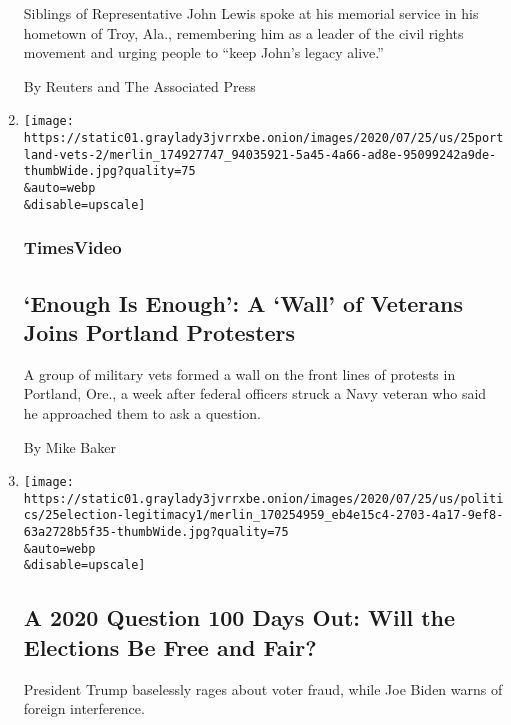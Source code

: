 \begin{enumerate}
  Siblings of Representative John Lewis spoke at his memorial service in
  his hometown of Troy, Ala., remembering him as a leader of the civil
  rights movement and urging people to ``keep John's legacy alive.''

  By Reuters and The Associated Press
\item
  \href{/video/us/politics/100000007256689/portland-protest-wall-of-vets.html}{}

  \texttt{[image: https://static01.graylady3jvrrxbe.onion/images/2020/07/25/us/25portland-vets-2/merlin\_174927747\_94035921-5a45-4a66-ad8e-95099242a9de-thumbWide.jpg?quality=75\\\&auto=webp\\\&disable=upscale]}

  \hypertarget{timesvideo-1}{%
  \subsubsection{TimesVideo}\label{timesvideo-1}}

  \hypertarget{enough-is-enough-a-wall-of-veterans-joins-portland-protesters}{%
  \subsection{`Enough Is Enough': A `Wall' of Veterans Joins Portland
  Protesters}\label{enough-is-enough-a-wall-of-veterans-joins-portland-protesters}}

  A group of military vets formed a wall on the front lines of protests
  in Portland, Ore., a week after federal officers struck a Navy veteran
  who said he approached them to ask a question.

  By Mike Baker
\item
  \href{/2020/07/25/us/politics/2020-election-voter-fraud-interference.html}{}

  \texttt{[image: https://static01.graylady3jvrrxbe.onion/images/2020/07/25/us/politics/25election-legitimacy1/merlin\_170254959\_eb4e15c4-2703-4a17-9ef8-63a2728b5f35-thumbWide.jpg?quality=75\\\&auto=webp\\\&disable=upscale]}

  \hypertarget{a-2020-question-100-days-out-will-the-elections-be-free-and-fair-1}{%
  \subsection{A 2020 Question 100 Days Out: Will the Elections Be Free
  and
  Fair?}\label{a-2020-question-100-days-out-will-the-elections-be-free-and-fair-1}}

  President Trump baselessly rages about voter fraud, while Joe Biden
  warns of foreign interference.


\end{enumerate}
